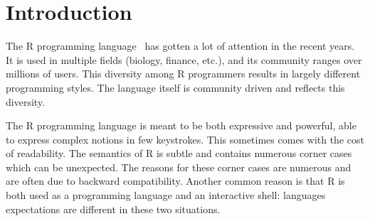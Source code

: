 \documentclass[
    sigplan,
    10pt,
    review, %
    natbib=false %
 ]{acmart}
\begin{document}


\maketitle

\section{Introduction}
\label{sec:intro}

The R programming language~\parencite{R, ihaka1996r, Rwebsite}
has gotten a lot of attention in the recent years.
It is used in multiple fields (biology, finance, etc.),
and its community ranges over millions of users.
This diversity among R programmers
results in largely different programming styles.
The language itself is community driven and reflects this diversity.

The R programming language is meant to be both expressive and powerful,
able to express complex notions in few keystrokes.
This sometimes comes with the cost of readability.
The semantics of R is subtle and contains numerous corner cases
which can be unexpected.
The reasons for these corner cases are numerous
and are often due to backward compatibility.
Another common reason is that R
is both used as a programming language and an interactive shell:
languages expectations are different in these two situations.
\end{document}
